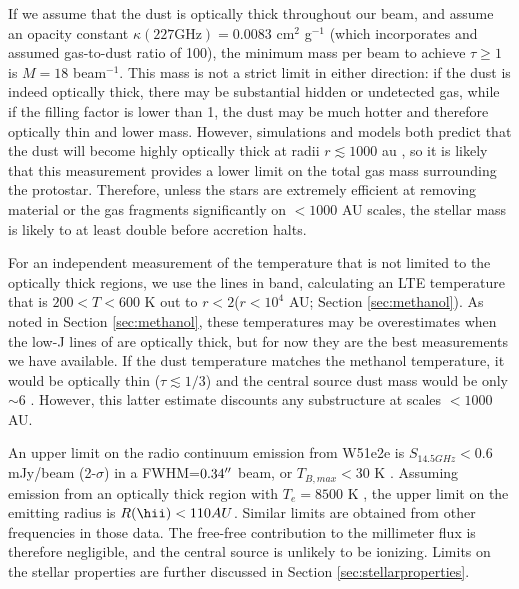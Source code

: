 \documentclass[twocolumn]{aastex61}
\begin{document}

If we assume that the dust is optically thick throughout our beam, and assume
an opacity constant $\kappa(227 \mathrm{GHz})=0.0083$ cm$^2$ g$^{-1}$  (which
incorporates and assumed gas-to-dust ratio of 100), the minimum mass
per beam to achieve $\tau\geq1$ is $M=18$ \msun beam$^{-1}$.  This  mass is not
a strict limit in either direction: if the dust is indeed optically thick,
there may be substantial hidden or undetected gas, while if the filling factor
is lower than 1, the dust may be much hotter and therefore optically thin and
lower  mass.  However, simulations and models both predict that the dust will
become highly optically thick at radii $r\lesssim1000$ au
\citep{Forgan2016a,Klassen2016a}, so it is likely that this measurement
provides  a lower limit on the total gas mass surrounding the protostar.
Therefore, unless the stars are extremely efficient at removing material or the
gas fragments significantly on $<1000$ AU scales, the stellar mass is likely to
at least double before accretion halts.

For an independent measurement of the temperature that is not limited to the
optically thick regions, we use the \methanol lines in band, calculating an LTE
temperature that is $200 < T < 600$ K out to $r<2$\arcsec ($r<10^4$ AU; Section
\ref{sec:methanol}).  As noted in Section \ref{sec:methanol}, these
temperatures may be overestimates when the low-J lines of \methanol are
optically thick, but for now they are the best measurements we have available.
If the dust temperature matches the methanol temperature, it would be optically
thin ($\tau \lesssim 1/3$) and the central source dust mass would be only
$\sim6$ \msun.  However, this latter estimate discounts any substructure at
scales $<1000$ AU. %

An upper limit on the radio continuum emission from W51e2e is $S_{14.5 GHz} <
0.6$ mJy/beam (2-$\sigma$) in a FWHM=$0.34\mbox{$^{\prime\prime}$}$ beam, or $T_{B,max} < 30$ K
\citep{Ginsburg2016b}.  Assuming emission from an optically thick \hii region
with $T_e = 8500$ K \citep{Ginsburg2015a}, the upper limit on the emitting
radius is $R(\hii) < 110 AU$.  Similar limits are obtained from other
frequencies in those data.  The free-free contribution to the millimeter
flux is therefore negligible, and the central source is unlikely to be
ionizing.  Limits on the stellar properties are further discussed in
Section \ref{sec:stellarproperties}.
\end{document}
